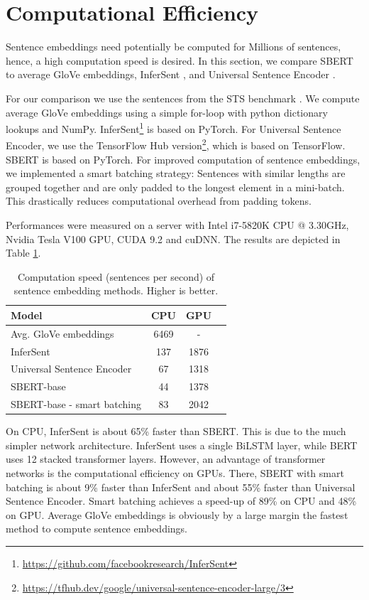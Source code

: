 \documentclass[11pt,a4paper]{article}
\begin{document}
\section{Computational Efficiency} \label{sec_computational_efficiency}

Sentence embeddings need potentially be computed for Millions of sentences, hence, a high computation speed is desired. In this section, we compare SBERT to average GloVe embeddings, InferSent \cite{conneau2017infersent}, and Universal Sentence Encoder \cite{universal_sentence_encoder}.

For our comparison we use the sentences from the STS benchmark \cite{sts2017}. We compute average GloVe embeddings using a simple for-loop with python dictionary lookups and NumPy. InferSent\footnote{\url{https://github.com/facebookresearch/InferSent}} is based on PyTorch. For Universal Sentence Encoder, we use the TensorFlow Hub version\footnote{\url{https://tfhub.dev/google/universal-sentence-encoder-large/3}}, which is based on TensorFlow. SBERT is based on PyTorch. For improved computation of sentence embeddings, we implemented a smart batching strategy: Sentences with similar lengths are grouped together and are only padded to the longest element in a mini-batch. This drastically reduces computational overhead from padding tokens.   

Performances were measured on a server with Intel i7-5820K CPU @ 3.30GHz, Nvidia Tesla V100 GPU, CUDA 9.2 and cuDNN. The results are depicted in Table \ref{table_computational_efficiency}.


\begin{table}[h]
	\centering 
	\footnotesize
	\begin{tabular}{|l|c|c|c|}
		\hline
		\textbf{Model} & \textbf{CPU} & \textbf{GPU}  \\ \hline
		Avg. GloVe embeddings & 6469 & - \\
		InferSent & 137 & 1876 \\ 
		Universal Sentence Encoder & 67 &  1318 \\
		SBERT-base & 44 & 1378 \\
		SBERT-base - smart batching & 83 & 2042 \\
		\hline			
	\end{tabular}
	\caption{Computation speed (sentences per second) of sentence embedding methods. Higher is better.}
	\label{table_computational_efficiency}
\end{table}

On CPU, InferSent is about 65\% faster than SBERT. This is due to the much simpler network architecture. InferSent uses a single Bi\-LSTM layer, while BERT uses 12 stacked transformer layers. However, an advantage of transformer networks is the computational efficiency on GPUs. There, SBERT with smart batching is about 9\% faster than InferSent and about  55\% faster than Universal Sentence Encoder. Smart batching achieves a speed-up of 89\% on CPU and 48\% on GPU. Average GloVe embeddings is obviously by a large margin the fastest method to compute sentence embeddings. 
\end{document}
